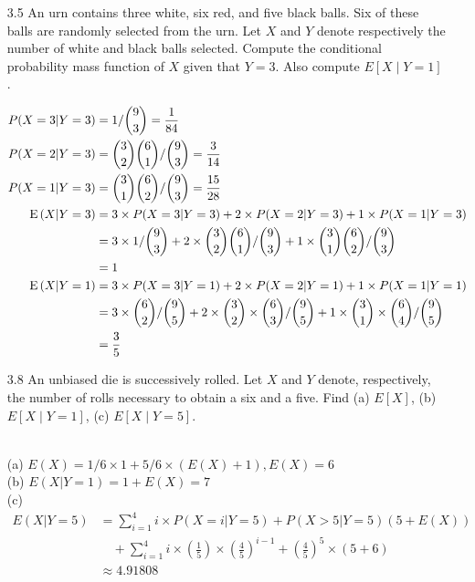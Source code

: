 \documentclass[en,hazy,blue,12pt,device = normal]{elegantnote}
\begin{document}
\begin{enumerate}
    \item[3.5] An urn contains three white, six red, and five black balls. Six of these balls are randomly selected from the urn. Let $X$ and $Y$ denote respectively the number of white and black balls selected. Compute the conditional probability mass function of $X$ given that $Y=3$. Also compute $E[X \mid Y=1]$.
    \begin{tcolorbox}
        \sol
        \begin{align*}
            P(X=3|Y=3) &= 1/\binom{9}{3} = \frac{1}{84}\\
            P(X = 2|Y=3) &= \binom{3}{2}\binom{6}{1}/\binom{9}{3} = \frac{3}{14}\\
            P(X= 1|Y=3) &= \binom{3}{1}\binom{6}{2} /\binom{9}{3} = \frac{15}{28}\\
            \operatorname E\left(X|Y=3\right) &= 3\times P(X=3|Y=3) + 2\times P(X = 2|Y=3) + 1\times P(X= 1|Y=3) \\
            &= 3\times 1/\binom{9}{3} + 2\times \binom{3}{2}\binom{6}{1}/\binom{9}{3} +1\times \binom{3}{1}\binom{6}{2} /\binom{9}{3}\\
            &= 1\\
            \operatorname E\left(X|Y=1\right) &= 3\times P(X=3|Y=1) + 2\times P(X = 2|Y=1) + 1\times P(X= 1|Y=1)\\
            &=3\times \binom{6}{2}/\binom{9}{5} + 2\times \binom{3}{2}\times\binom{6}{3}/\binom{9}{5} +1\times \binom{3}{1}\times\binom{6}{4} /\binom{9}{5}\\
            &= \frac{3}{5}
        \end{align*}
    \end{tcolorbox}
    \item[3.8]An unbiased die is successively rolled. Let $X$ and $Y$ denote, respectively, the number of rolls necessary to obtain a six and a five. Find (a) $E[X]$, (b) $E[X \mid Y=1]$, (c) $E[X \mid Y=5]$.
    \begin{tcolorbox}
        \sol\\
        (a) \(E(X) = 1/6\times 1 + 5/6\times (E(X)+1), E(X) = 6\)\\
        (b) \(E(X|Y = 1) = 1 + E(X) = 7\)\\
        (c) \begin{align*}
            E(X|Y=5) &= \sum_{i=1}^4 i\times P(X=i|Y=5)+ P(X > 5|Y=5)(5+E(X))\\
            &\quad + \sum_{i=1}^4 i\times\left(\frac 1 5\right)\times\left(\frac 4 5\right)^{i-1} + \left(\frac 4 5\right)^{5}\times(5+6)\\
            &\approx 4.91808
        \end{align*}
    \end{tcolorbox}


\end{enumerate}
\end{document}
